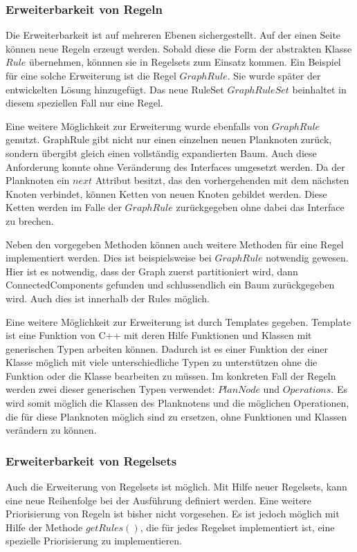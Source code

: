 \subsubsection{Erweiterbarkeit von Regeln}

Die Erweiterbarkeit ist auf mehreren Ebenen sichergestellt. Auf der einen Seite können neue Regeln erzeugt werden. Sobald diese die Form der abstrakten Klasse $Rule$ übernehmen, könnnen sie in Regelsets zum Einsatz kommen. Ein Beispiel für eine solche Erweiterung ist die Regel $GraphRule$. Sie wurde später der entwickelten Lösung hinzugefügt. Das neue RuleSet $GraphRuleSet$ beinhaltet in diesem speziellen Fall nur eine Regel.

Eine weitere Möglichkeit zur Erweiterung wurde ebenfalls von $GraphRule$ genutzt. GraphRule gibt nicht nur einen einzelnen neuen Planknoten zurück, sondern übergibt gleich einen vollständig expandierten Baum. Auch diese Anforderung konnte ohne Veränderung des Interfaces umgesetzt werden. Da der Planknoten ein $next$ Attribut besitzt, das den vorhergehenden mit dem nächsten Knoten verbindet, können Ketten von neuen Knoten gebildet werden. Diese Ketten werden im Falle der $GraphRule$ zurückgegeben ohne dabei das Interface zu brechen.

Neben den vorgegeben Methoden können auch weitere Methoden für eine Regel implementiert werden. Dies ist beispielsweise bei $GraphRule$ notwendig gewesen. Hier ist es notwendig, dass der Graph zuerst partitioniert wird, dann ConnectedComponents gefunden und schlussendlich ein Baum zurückgegeben wird. Auch dies ist innerhalb der Rules möglich.

Eine weitere Möglichkeit zur Erweiterung ist durch Templates gegeben. Template ist eine Funktion von C++ mit deren Hilfe Funktionen und Klassen mit generischen Typen arbeiten können. Dadurch ist es einer Funktion der einer Klasse möglich mit viele unterschiedliche Typen zu unterstützen ohne die Funktion oder die Klasse bearbeiten zu müssen. Im konkreten Fall der Regeln werden zwei dieser generischen Typen verwendet: $PlanNode$ und $Operations$. Es wird somit möglich die Klassen des Planknotens und die möglichen Operationen, die für diese Planknoten möglich sind zu ersetzen, ohne Funktionen und Klassen verändern zu können.

\subsubsection{Erweiterbarkeit von Regelsets}

Auch die Erweiterung von Regelsets ist möglich. Mit Hilfe neuer Regelsets, kann eine neue Reihenfolge bei der Ausführung definiert werden. Eine weitere Priorisierung von Regeln ist bisher nicht vorgesehen. Es ist jedoch möglich mit Hilfe der Methode $getRules()$, die für jedes Regelset implementiert ist, eine spezielle Priorisierung zu implementieren. 

